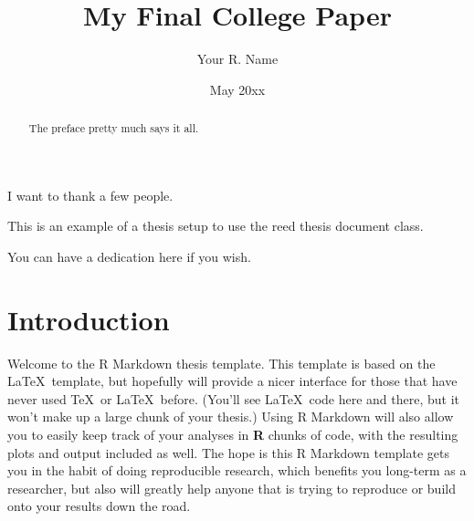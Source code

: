 \documentclass[12pt,twoside]{reedthesis}
\title{My Final College Paper}
\author{Your R. Name}
\date{May 20xx}
\begin{document}
      \maketitle
  
  \frontmatter %
  \pagestyle{empty} %

      \begin{acknowledgements}
      I want to thank a few people.
    \end{acknowledgements}
  
      \begin{preface}
      This is an example of a thesis setup to use the reed thesis document
      class.
    \end{preface}
  

    {
    \hypersetup{linkcolor=black}
    \setcounter{tocdepth}{2}
    \tableofcontents
  }
  
      \listoftables
  
      \listoffigures
  
      \begin{abstract}
      The preface pretty much says it all.
    \end{abstract}
  
      \begin{dedication}
      You can have a dedication here if you wish.
    \end{dedication}
  
%  
  \mainmatter %
  \pagestyle{fancyplain} %

  \chapter*{Introduction}
  
  
   
  
  Welcome to the R Markdown thesis template. This template is based on the
  \LaTeX~template, but hopefully will provide a nicer interface for those
  that have never used \TeX~or \LaTeX~before. (You'll see \LaTeX~code here
  and there, but it won't make up a large chunk of your thesis.) Using R
  Markdown will also allow you to easily keep track of your analyses in
  \textbf{R} chunks of code, with the resulting plots and output included
  as well. The hope is this R Markdown template gets you in the habit of
  doing reproducible research, which benefits you long-term as a
  researcher, but also will greatly help anyone that is trying to
  reproduce or build onto your results down the road.
  
\end{document}
